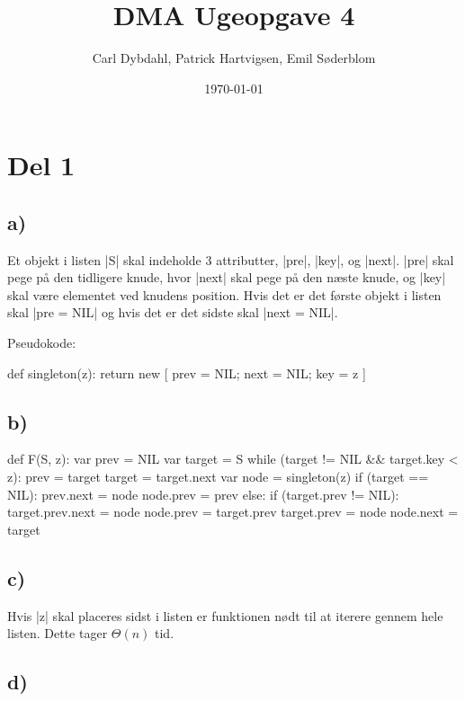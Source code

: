 \documentclass[a4paper]{article}
\title{DMA Ugeopgave 4}
\author{Carl Dybdahl, Patrick Hartvigsen, Emil Søderblom}
\date{\today}
\begin{document}
\maketitle

\section{Del 1}

\subsection{a)}

Et objekt i listen \code|S| skal indeholde 3 attributter, \code|pre|, \code|key|, og \code|next|. \code|pre| skal pege på den tidligere knude, hvor \code|next| skal pege på den næste knude, og \code|key| skal være elementet ved knudens position. Hvis det er det første objekt i listen skal \code|pre = NIL| og hvis det er det sidste skal \code|next = NIL|.

Pseudokode:

\begin{Code}
def singleton(z):
	return new [ prev = NIL; next = NIL; key = z ]
\end{Code}

\subsection{b)}

\begin{Code}
def F(S, z):
	var prev = NIL
	var target = S
	while (target != NIL && target.key < z):
		prev = target
		target = target.next
	var node = singleton(z)
	if (target == NIL):
		prev.next = node
		node.prev = prev
	else:
		if (target.prev != NIL):
			target.prev.next = node
			node.prev = target.prev
		target.prev = node
		node.next = target
\end{Code}

\subsection{c)}

Hvis \code|z| skal placeres sidst i listen er funktionen nødt til at iterere gennem hele listen. Dette tager $\Theta(n)$ tid.

\subsection{d)}
\end{document}
